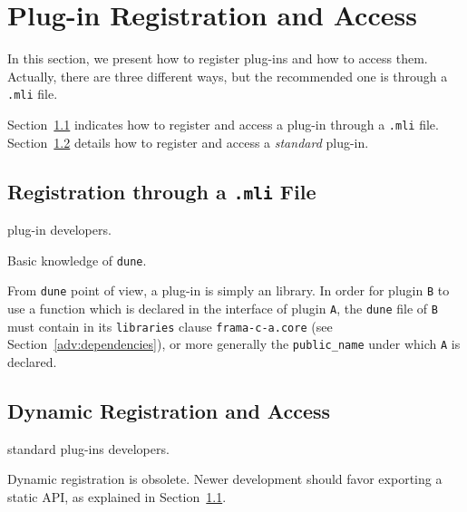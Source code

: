 
\section{Plug-in Registration and Access}\label{adv:plugin-registration}

In this section, we present how to register plug-ins and how to access them.
Actually, there are three different ways, but the recommended one is through a
\texttt{.mli} file.

Section~\ref{adv:standard-registration} indicates how to register and access a
plug-in through a \texttt{.mli} file. Section~\ref{adv:dynamic-registration}
details how to register and access a \emph{standard} plug-in.

\subsection{Registration through a \texttt{.mli} File}
\label{adv:standard-registration}

\begin{target}plug-in developers.\end{target}
\begin{prereq}
  Basic knowledge of \texttt{dune}.
\end{prereq}

From \texttt{dune} point of view, a plug-in is simply an \ocaml library.
In order for plugin \texttt{B} to use a function which is declared in
the interface of plugin \texttt{A}, the \texttt{dune} file of \texttt{B} must
contain in its \texttt{libraries} clause \texttt{frama-c-a.core}
(see Section~\ref{adv:dependencies}), or more generally the \texttt{public\_name}
under which \texttt{A} is declared.

\subsection{Dynamic Registration and Access}
\label{adv:dynamic-registration}

\begin{target}standard plug-ins developers.\end{target}

\begin{important}
Dynamic registration is obsolete. Newer development should favor exporting
a static API, as explained in Section~\ref{adv:standard-registration}.
\end{important}

